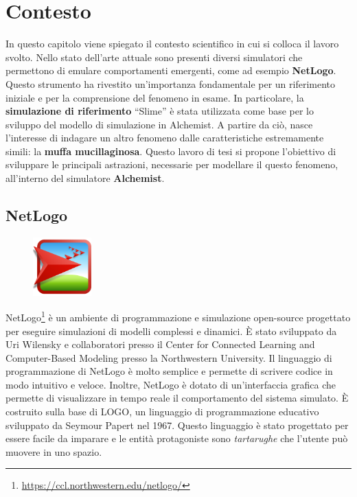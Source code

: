 \chapter{Contesto}
In questo capitolo viene spiegato il contesto scientifico in cui si colloca il lavoro svolto.
Nello stato dell'arte attuale sono presenti diversi simulatori che permettono di emulare comportamenti emergenti, come ad esempio \textbf{NetLogo}.
Questo strumento ha rivestito un'importanza fondamentale per un riferimento iniziale e per la comprensione del fenomeno in esame.
In particolare, la \textbf{simulazione di riferimento} ``Slime'' è stata utilizzata come base per lo sviluppo del modello di simulazione in Alchemist.
A partire da ciò, nasce l'interesse di indagare un altro fenomeno dalle caratteristiche estremamente simili: la \textbf{muffa mucillaginosa}.
Questo lavoro di tesi si propone l'obiettivo di sviluppare le principali astrazioni, necessarie per modellare il questo fenomeno,
all'interno del simulatore \textbf{Alchemist}.

\section{NetLogo}

\begin{figure}
    \centering
    \includegraphics[width=0.2\textwidth]{figures/net.png}
\end{figure}

NetLogo\footnote{\url{https://ccl.northwestern.edu/netlogo/}}\space\cite{wilensky1997netlogo} è un ambiente di programmazione e simulazione open-source
progettato per eseguire simulazioni di modelli complessi e dinamici. È stato sviluppato da Uri Wilensky
e collaboratori presso il Center for Connected Learning and Computer-Based Modeling presso la Northwestern University.
Il linguaggio di programmazione di NetLogo è molto semplice e permette di scrivere codice in modo
intuitivo e veloce. Inoltre, NetLogo è dotato di un'interfaccia grafica che permette di visualizzare
in tempo reale il comportamento del sistema simulato.
È costruito sulla base di LOGO, un linguaggio di programmazione educativo sviluppato
da Seymour Papert nel 1967. Questo linguaggio è stato progettato per essere facile da imparare e le entità protagoniste
sono \textit{tartarughe} che l'utente può muovere in uno spazio.

